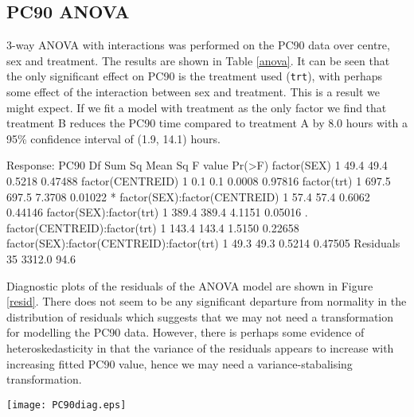 \subsection{PC90 ANOVA} 
3-way ANOVA with interactions was performed on the PC90 data over centre, sex and treatment. The results are shown in Table \ref{anova}. It can be seen that the only significant effect on PC90 is the treatment used (\texttt{trt}), with perhaps some effect of the interaction between sex and treatment. This is a result we might expect. If we fit a model with treatment as the only factor we find that treatment B reduces the PC90 time compared to treatment A by 8.0 hours with a 95\% confidence interval of (1.9, 14.1) hours.
\begin{table}[h]
\centering
\caption{3-way ANOVA with interactions for PC90}\label{anova}
\begin{boxedverbatim}
Response: PC90
                                         Df Sum Sq Mean Sq F value  Pr(>F)  
factor(SEX)                               1   49.4    49.4  0.5218 0.47488  
factor(CENTREID)                          1    0.1     0.1  0.0008 0.97816  
factor(trt)                               1  697.5   697.5  7.3708 0.01022 *
factor(SEX):factor(CENTREID)              1   57.4    57.4  0.6062 0.44146  
factor(SEX):factor(trt)                   1  389.4   389.4  4.1151 0.05016 .
factor(CENTREID):factor(trt)              1  143.4   143.4  1.5150 0.22658  
factor(SEX):factor(CENTREID):factor(trt)  1   49.3    49.3  0.5214 0.47505  
Residuals                                35 3312.0    94.6
\end{boxedverbatim}
\end{table}

Diagnostic plots of the residuals of the ANOVA model are shown in Figure \ref{resid}. There does not seem to be any significant departure from normality in the distribution of residuals which suggests that we may not need a transformation for modelling the PC90 data. However, there is perhaps some evidence of heteroskedasticity in that the variance of the residuals appears to increase with increasing fitted PC90 value, hence we may need a variance-stabalising transformation.
\begin{sidewaysfigure}[p]
\centering
\texttt{[image: PC90diag.eps]}
\caption{Residuals for ANOVA on PC90}\label{resid}
\end{sidewaysfigure}
